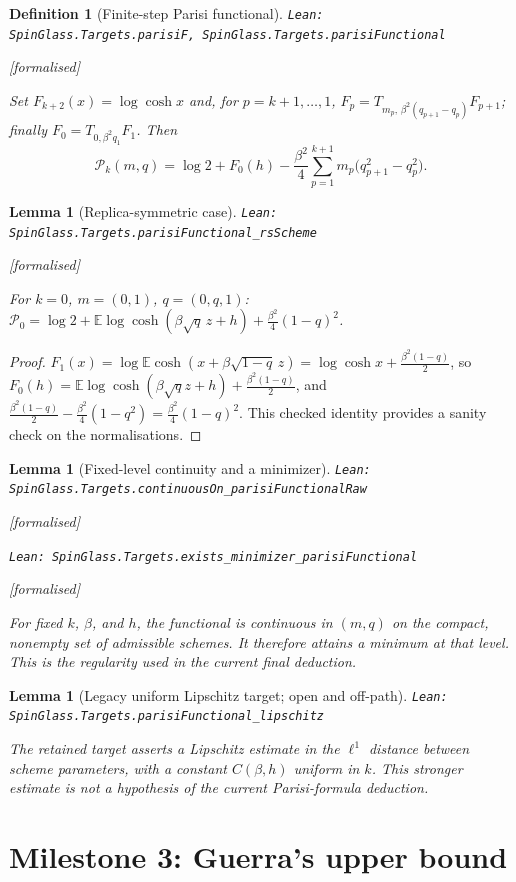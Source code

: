 \documentclass[11pt]{article}
\providecommand{\lean}[1]{\leavevmode\par\nopagebreak
  {\noindent\normalfont\footnotesize\raggedright\texttt{Lean: #1}\par}\nopagebreak}
\providecommand{\leanok}{\par\nopagebreak
  {\noindent\normalfont\footnotesize\textcolor{green!50!black}{[formalised]}\par}\nopagebreak}
\newtheorem{lemma}[theorem]{Lemma}
\newtheorem{definition}[theorem]{Definition}
\newcommand{\E}{\mathbb{E}}
\begin{document}
\begin{definition}[Finite-step Parisi functional]
\lean{SpinGlass.Targets.parisiF, SpinGlass.Targets.parisiFunctional}\leanok
Set $F_{k+2}(x)=\log\cosh x$ and, for $p=k+1,\dots,1$,
$F_p=T_{m_p,\,\beta^2(q_{p+1}-q_p)}F_{p+1}$; finally $F_0=T_{0,\beta^2q_1}F_1$.
Then
\[
\mathcal P_k(m,q)=\log2+F_0(h)-\frac{\beta^2}{4}\sum_{p=1}^{k+1}m_p\big(q_{p+1}^2-q_p^2\big).
\]
\end{definition}

\begin{lemma}[Replica-symmetric case]
\lean{SpinGlass.Targets.parisiFunctional\_rsScheme}\leanok
For $k=0$, $m=(0,1)$, $q=(0,q,1)$:
$\mathcal P_0=\log2+\E\log\cosh(\beta\sqrt q\,z+h)+\frac{\beta^2}4(1-q)^2$.
\end{lemma}
\begin{proof}
$F_1(x)=\log\E\cosh(x+\beta\sqrt{1-q}\,z)=\log\cosh x+\frac{\beta^2(1-q)}2$, so
$F_0(h)=\E\log\cosh(\beta\sqrt qz+h)+\frac{\beta^2(1-q)}2$, and
$\frac{\beta^2(1-q)}2-\frac{\beta^2}4(1-q^2)=\frac{\beta^2}4(1-q)^2$.
This checked identity provides a sanity check on the normalisations.
\end{proof}

\begin{lemma}[Fixed-level continuity and a minimizer]
\lean{SpinGlass.Targets.continuousOn\_parisiFunctionalRaw}\leanok
\lean{SpinGlass.Targets.exists\_minimizer\_parisiFunctional}\leanok
For fixed $k$, $\beta$, and $h$, the functional is continuous in $(m,q)$ on the
compact, nonempty set of admissible schemes. It therefore attains a minimum
at that level. This is the regularity used in the current final deduction.
\end{lemma}

\begin{lemma}[Legacy uniform Lipschitz target; open and off-path]
\lean{SpinGlass.Targets.parisiFunctional\_lipschitz}
The retained target asserts a Lipschitz estimate in the $\ell^1$ distance between
scheme parameters, with a constant $C(\beta,h)$ uniform in $k$.
This stronger estimate is not a hypothesis of the current Parisi-formula deduction.
\end{lemma}

\section{Milestone 3: Guerra's upper bound}
\end{document}
